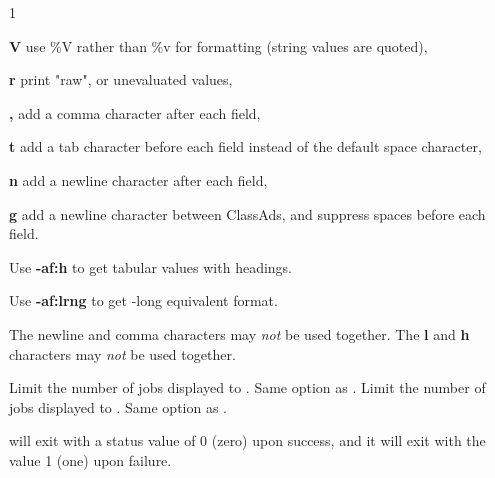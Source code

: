 \begin{ManPage}{\label{man-condor-history}}{1}
\begin{Options}
{    \textbf{V} use \%V rather than \%v for formatting (string values
    are quoted),

    \textbf{r} print "raw", or unevaluated values,

    \textbf{,} add a comma character after each field,

    \textbf{t} add a tab character before each field instead of 
    the default space character,

    \textbf{n} add a newline character after each field,

    \textbf{g} add a newline character between ClassAds, and
    suppress spaces before each field.

    Use \textbf{-af:h} to get tabular values with headings.

    Use \textbf{-af:lrng} to get -long equivalent format.

    The newline and comma characters may \emph{not} be used together.
    The \textbf{l} and \textbf{h} characters may \emph{not} be used
    together.
    }
    {Limit the number of jobs displayed to .  Same option as
    . }
    {Limit the number of jobs displayed to . Same option as
    . } 
\end{Options}

\ExitStatus

 will exit with a status value of 0 (zero) upon success,
and it will exit with the value 1 (one) upon failure.

\end{ManPage}
